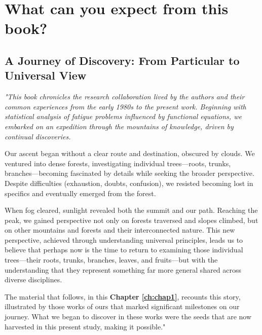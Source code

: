 \startcontents[chapter]

\chapter{What can you expect from this book?}\label{ch:chap1}
\minitocboxed

\section*{A Journey of Discovery: From Particular to Universal View}
\begin{importantbox}
\setlength{\parskip}{2mm}
\setlength{\baselineskip}{1.1em}
{\it\footnotesize
"This book chronicles the research collaboration lived by the authors and their common experiences from the early 1980s to the present work. Beginning with statistical analysis of fatigue problems influenced by functional equations, we embarked on an expedition through the mountains of knowledge, driven by continual discoveries.

Our ascent began without a clear route and destination, obscured by clouds. We ventured into dense forests, investigating individual trees—roots, trunks, branches—becoming fascinated by details while seeking the broader perspective. Despite difficulties (exhaustion, doubts, confusion), we resisted becoming lost in specifics and eventually emerged from the forest.

When fog cleared, sunlight revealed both the summit and our path. Reaching the peak, we gained perspective not only on forests traversed and slopes climbed, but on other mountains and forests and their interconnected nature. This new perspective, achieved through understanding universal principles, leads us to believe that perhaps now is the time to return to examining those individual trees—their roots, trunks, branches, leaves, and fruits—but with the understanding that they represent something far more general shared across diverse disciplines.

The material that follows, in this \textbf{Chapter \ref{ch:chap1}}, recounts this story, illustrated by those works of ours that marked significant milestones on our journey. What we began to discover in these works were the seeds that are now harvested in this present study, making it possible."}
\end{importantbox}

